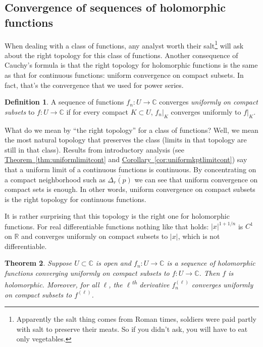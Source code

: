 \documentclass[12pt,openany]{book}
\newcommand{\sabs}[1]{\lvert {#1} \rvert}
\newcommand{\C}{{\mathbb{C}}}
\newcommand{\R}{{\mathbb{R}}}
\newcommand{\myindex}[1]{#1\index{#1}}
\newcommand{\myquote}[1]{``#1''}
\theoremstyle{plain}
\newtheorem{thm}{Theorem}[section]
\theoremstyle{remark}
\theoremstyle{definition}
\newtheorem{defn}[thm]{Definition}
\theoremstyle{exercise}
\theoremstyle{example}
\newcommand{\thmref}[1]{\hyperref[#1]{Theorem~\ref*{#1}}}
\newcommand{\corref}[1]{\hyperref[#1]{Corollary~\ref*{#1}}}
\begin{document}
\subsection{Convergence of sequences of holomorphic functions}

When dealing with a class of functions, any analyst worth their
salt\footnote{Apparently the salt thing
comes from Roman times, soldiers were
paid partly with salt to preserve their meats.  So if you didn't ask,
you will have to eat only vegetables.} will ask about the right topology for this class of
functions.
Another consequence of Cauchy's formula is that the right topology for
holomorphic functions is the same as that for continuous functions: uniform
convergence on compact subsets.  In fact, that's the convergence that we
used for power series.

\begin{defn}
A sequence of functions $f_n \colon U \to \C$ converges
\emph{\myindex{uniformly on compact subsets}}%
to $f \colon U \to \C$ if for every compact $K \subset U$,
$f_n|_K$ converges uniformly to $f|_K$.
\end{defn}

What do we mean by \myquote{the right topology} for a class of functions?
Well, we mean the most natural
topology that preserves the class (limits in that topology are still in that
class).  
Results from introductory analysis
(see \thmref{thm:uniformlimitcont} and \corref{cor:uniformkptlimitcont})
say that a uniform limit of a continuous functions is continuous.
By concentrating on a compact neighborhood such as $\overline{\Delta_r(p)}$
we can see that uniform convergence on compact sets is enough.
In other words, uniform convergence on compact subsets is the right topology
for continuous functions.

It is rather surprising that this topology is the right one for holomorphic
functions.  For real
differentiable functions nothing like that holds: $\sabs{x}^{1+1/n}$
is $C^1$ on $\R$ and converges uniformly on compact subsets to $\sabs{x}$,
which is not differentiable.

\begin{thm} \label{thm:unifoncompact}
Suppose $U \subset \C$ is open and $f_n \colon U \to \C$ is a sequence
of holomorphic functions converging uniformly on compact subsets to
$f \colon U \to \C$.  Then $f$ is holomorphic.
Moreover, for all $\ell$, the $\ell$\textsuperscript{th} derivative
$f_n^{(\ell)}$ converges uniformly on compact subsets to $f^{(\ell)}$.
\end{thm}
\end{document}
